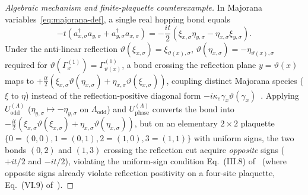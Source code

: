 \documentclass[11pt]{article}
\theoremstyle{definition}
\theoremstyle{remark}
\begin{document}
\begin{proof}[Algebraic mechanism and finite-plaquette counterexample]
In Majorana variables~\eqref{eq:majorana-def}, a single real hopping bond equals
\begin{equation}\label{eq:bond-maj}
-t(a_{x,\sigma}^\dagger a_{y,\sigma} + a_{y,\sigma}^\dagger a_{x,\sigma}) = -\frac{it}{2}\left(\xi_{x,\sigma}\eta_{y,\sigma} - \eta_{x,\sigma}\xi_{y,\sigma}\right).
\end{equation}
Under the anti-linear reflection $\vartheta(\xi_{x,\sigma}) = \xi_{\vartheta(x),\sigma}$, $\vartheta(\eta_{x,\sigma}) = -\eta_{\vartheta(x),\sigma}$ required for $\vartheta(\Gamma_x^{(1)}) = \Gamma_{\vartheta(x)}^{(1)}$, a bond crossing the reflection plane $y = \vartheta(x)$ maps to $+\frac{it}{2}(\xi_{x,\sigma}\vartheta(\eta_{x,\sigma}) + \eta_{x,\sigma}\vartheta(\xi_{x,\sigma}))$, coupling distinct Majorana species ($\xi$ to $\eta$) instead of the reflection-positive diagonal form $-i\kappa_e \gamma_x \vartheta(\gamma_x)$~\cite{jaffe2015a}. Applying $U_{\mathrm{odd}}^{(\Lambda)}$ ($\eta_{y,\sigma} \mapsto -\eta_{y,\sigma}$ on $\Lambda_{\mathrm{odd}}$) and $U_{\mathrm{phase}}^{(\Lambda)}$ converts the bond into $-\frac{it}{2}(\xi_{x,\sigma}\vartheta(\xi_{x,\sigma}) + \eta_{x,\sigma}\vartheta(\eta_{x,\sigma}))$, but on an elementary $2 \times 2$ plaquette $\{0=(0,0), 1=(0,1), 2=(1,0), 3=(1,1)\}$ with uniform signs, the two bonds $(0,2)$ and $(1,3)$ crossing the reflection cut acquire \emph{opposite} signs ($+it/2$ and $-it/2$), violating the uniform-sign condition Eq.~(III.8) of~\cite{jaffe2015a} (where opposite signs already violate reflection positivity on a four-site plaquette, Eq.~(VI.9) of~\cite{jaffe2015a}).


\end{proof}
\end{document}
